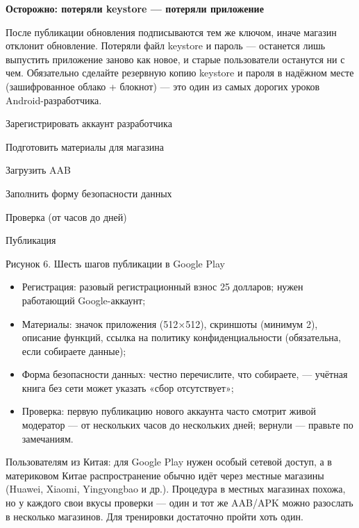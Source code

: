 \textbf{Осторожно: потеряли keystore — потеряли приложение}\par

После публикации обновления подписываются тем же ключом, иначе магазин отклонит обновление. Потеряли файл keystore и пароль — останется лишь выпустить приложение заново как новое, и старые пользователи останутся ни с чем. Обязательно сделайте резервную копию keystore и пароля в надёжном месте (зашифрованное облако + блокнот) — это один из самых дорогих уроков Android-разработчика.


Зарегистрировать аккаунт разработчика

Подготовить материалы для магазина

Загрузить AAB

Заполнить форму безопасности данных

Проверка (от часов до дней)

Публикация

\begin{center}\small\color{gray}Рисунок 6. Шесть шагов публикации в Google Play\end{center}

\begin{itemize}
  \item Регистрация: разовый регистрационный взнос 25 долларов; нужен работающий Google-аккаунт;
  \item Материалы: значок приложения (512×512), скриншоты (минимум 2), описание функций, ссылка на политику конфиденциальности (обязательна, если собираете данные);
  \item Форма безопасности данных: честно перечислите, что собираете, — учётная книга без сети может указать «сбор отсутствует»;
  \item Проверка: первую публикацию нового аккаунта часто смотрит живой модератор — от нескольких часов до нескольких дней; вернули — правьте по замечаниям.
\end{itemize}

Пользователям из Китая: для Google Play нужен особый сетевой доступ, а в материковом Китае распространение обычно идёт через местные магазины (Huawei, Xiaomi, Yingyongbao и др.). Процедура в местных магазинах похожа, но у каждого свои вкусы проверки — один и тот же AAB/APK можно разослать в несколько магазинов. Для тренировки достаточно пройти хоть один.



